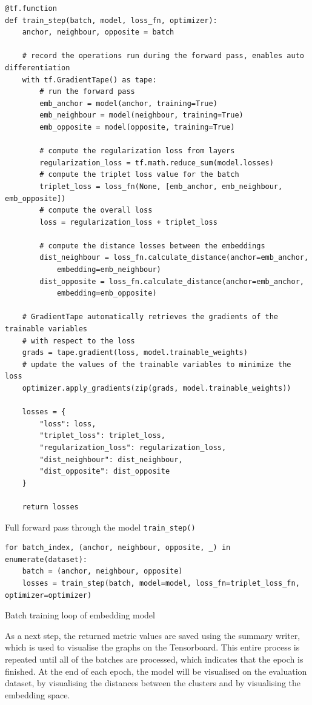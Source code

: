 \begin{code}[htbp]
\begin{verbatim}
@tf.function
def train_step(batch, model, loss_fn, optimizer):
    anchor, neighbour, opposite = batch

    # record the operations run during the forward pass, enables auto differentiation
    with tf.GradientTape() as tape:
        # run the forward pass
        emb_anchor = model(anchor, training=True)
        emb_neighbour = model(neighbour, training=True)
        emb_opposite = model(opposite, training=True)

        # compute the regularization loss from layers
        regularization_loss = tf.math.reduce_sum(model.losses)
        # compute the triplet loss value for the batch
        triplet_loss = loss_fn(None, [emb_anchor, emb_neighbour, emb_opposite])
        # compute the overall loss
        loss = regularization_loss + triplet_loss

        # compute the distance losses between the embeddings
        dist_neighbour = loss_fn.calculate_distance(anchor=emb_anchor, 
            embedding=emb_neighbour)
        dist_opposite = loss_fn.calculate_distance(anchor=emb_anchor, 
            embedding=emb_opposite)

    # GradientTape automatically retrieves the gradients of the trainable variables
    # with respect to the loss
    grads = tape.gradient(loss, model.trainable_weights)
    # update the values of the trainable variables to minimize the loss
    optimizer.apply_gradients(zip(grads, model.trainable_weights))

    losses = {
        "loss": loss,
        "triplet_loss": triplet_loss,
        "regularization_loss": regularization_loss,
        "dist_neighbour": dist_neighbour,
        "dist_opposite": dist_opposite
    }

    return losses
\end{verbatim}
\caption{Full forward pass through the model \texttt{train\_step()}}
\label{code:Train-Step}
\end{code}

\begin{code}[H]
\begin{verbatim}
for batch_index, (anchor, neighbour, opposite, _) in enumerate(dataset):
    batch = (anchor, neighbour, opposite)
    losses = train_step(batch, model=model, loss_fn=triplet_loss_fn, optimizer=optimizer)
\end{verbatim}
\caption{Batch training loop of embedding model}
\label{code:Batch-Loop-Embedding-Model}
\end{code}
\noindent
As a next step, the returned metric values are saved using the summary writer, which is used to visualise the graphs on the Tensorboard. This entire process is repeated until all of the batches are processed, which indicates that the epoch is finished. At the end of each epoch, the model will be visualised on the evaluation dataset, by visualising the distances between the clusters and by visualising the embedding space.

